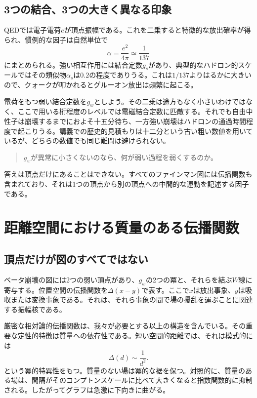\subsection{3つの結合、3つの大きく異なる印象}

QEDでは電子電荷\(e\)が頂点振幅である。これを二乗すると特徴的な放出確率が得られ、慣例的な因子は自然単位で
\begin{equation}
  \alpha=\frac{e^2}{4\pi}\simeq\frac1{137}
\end{equation}
にまとめられる。強い相互作用には結合定数\(g_s\)があり、典型的なハドロン的スケールではその類似物\(\alpha_s\)は\(0.2\)の程度でありうる。これは\(1/137\)よりはるかに大きいので、クォークが叩かれるとグルーオン放出は頻繁に起こる。

電荷をもつ弱い結合定数を\(g_w\)としよう。その二乗は途方もなく小さいわけではなく、ここで用いる桁程度のレベルでは電磁結合定数に匹敵する。それでも自由中性子は崩壊するまでにおよそ十五分待ち、一方強い崩壊はハドロンの通過時間程度で起こりうる。講義での歴史的見積もりは十二分という古い粗い数値を用いているが、どちらの数値でも同じ難問は避けられない。
\begin{quote}
\(g_w\)が異常に小さくないのなら、何が弱い過程を弱くするのか。
\end{quote}

答えは頂点だけにあることはできない。すべてのファインマン図には伝播関数も含まれており、それは1つの頂点から別の頂点への中間的な運動を記述する因子である。

\section{距離空間における質量のある伝播関数}

\subsection{頂点だけが図のすべてではない}

ベータ崩壊の図には2つの弱い頂点があり、\(g_w\)の2つの冪と、それらを結ぶ\(W\)線に寄与する。位置空間の伝播関数を\(\Delta(x-y)\)で表す。ここで\(x\)は放出事象、\(y\)は吸収または変換事象である。それは、それら事象の間で場の擾乱を運ぶことに関連する振幅核である。

厳密な相対論的伝播関数は、我々が必要とする以上の構造を含んでいる。その重要な定性的特徴は質量への依存性である。短い空間的距離では、それは模式的には
\begin{equation}
  \Delta(d)\sim\frac1{d^2}.
\end{equation}
という冪的特異性をもつ。質量のない場は冪的な裾を保つ。対照的に、質量のある場は、間隔がそのコンプトンスケールに比べて大きくなると指数関数的に抑制される。したがってグラフは急激に下向きに曲がる。

